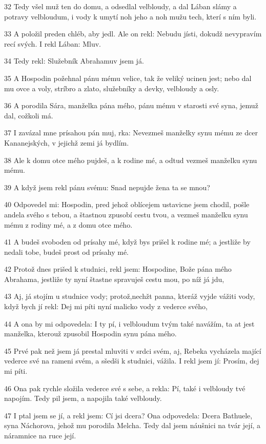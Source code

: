 \par 32 Tedy všel muž ten do domu, a odsedlal velbloudy, a dal Lában slámy a potravy velbloudum, i vody k umytí noh jeho a noh mužu tech, kterí s ním byli.
\par 33 A položil preden chléb, aby jedl. Ale on rekl: Nebudu jísti, dokudž nevypravím recí svých. I rekl Lában: Mluv.
\par 34 Tedy rekl: Služebník Abrahamuv jsem já.
\par 35 A Hospodin požehnal pánu mému velice, tak že veliký ucinen jest; nebo dal mu ovce a voly, stríbro a zlato, služebníky a devky, velbloudy a osly.
\par 36 A porodila Sára, manželka pána mého, pánu mému v starosti své syna, jemuž dal, cožkoli má.
\par 37 I zavázal mne prísahou pán muj, rka: Nevezmeš manželky synu mému ze dcer Kananejských, v jejichž zemi já bydlím.
\par 38 Ale k domu otce mého pujdeš, a k rodine mé, a odtud vezmeš manželku synu mému.
\par 39 A když jsem rekl pánu svému: Snad nepujde žena ta se mnou?
\par 40 Odpovedel mi: Hospodin, pred jehož oblícejem ustavicne jsem chodil, pošle andela svého s tebou, a štastnou zpusobí cestu tvou, a vezmeš manželku synu mému z rodiny mé, a z domu otce mého.
\par 41 A budeš svoboden od prísahy mé, když bys prišel k rodine mé; a jestliže by nedali tobe, budeš prost od prísahy mé.
\par 42 Protož dnes prišed k studnici, rekl jsem: Hospodine, Bože pána mého Abrahama, jestliže ty nyní štastne spravuješ cestu mou, po níž já jdu,
\par 43 Aj, já stojím u studnice vody; protož,nechžt panna, kteráž vyjde vážiti vody, když bych jí rekl: Dej mi píti nyní malicko vody z vederce svého,
\par 44 A ona by mi odpovedela: I ty pí, i velbloudum tvým také navážím, ta at jest manželka, kterouž zpusobil Hospodin synu pána mého.
\par 45 Prvé pak než jsem já prestal mluviti v srdci svém, aj, Rebeka vycházela mající vederce své na rameni svém, a sšedši k studnici, vážila. I rekl jsem jí: Prosím, dej mi píti.
\par 46 Ona pak rychle složila vederce své s sebe, a rekla: Pí, také i velbloudy tvé napojím. Tedy pil jsem, a napojila také velbloudy.
\par 47 I ptal jsem se jí, a rekl jsem: Cí jsi dcera? Ona odpovedela: Dcera Bathuele, syna Náchorova, jehož mu porodila Melcha. Tedy dal jsem náušnici na tvár její, a náramnice na ruce její.
